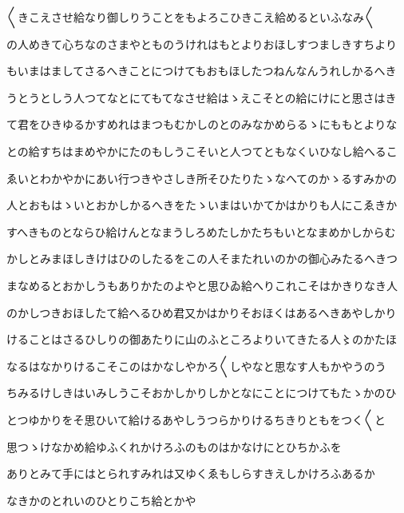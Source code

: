 \documentclass[a4paper,11pt,landscape]{ltjtarticle}
\begin{document}
〱きこえさせ給なり御しりうことをもよろこひきこえ給めるといふなみ〱
\par\medskip
の人めきて心ちなのさまやとものうけれはもとよりおほしすつましきすちより
\par\medskip
もいまはましてさるへきことにつけてもおもほしたつねんなんうれしかるへき
\par\medskip
うとうとしう人つてなとにてもてなさせ給はゝえこそとの給にけにと思さはき
\par\medskip
て君をひきゆるかすめれはまつもむかしのとのみなかめらるゝにももとよりな
\par\medskip
との給すちはまめやかにたのもしうこそいと人つてともなくいひなし給へるこ
\par\medskip
ゑいとわかやかにあい行つきやさしき所そひたりたゝなへてのかゝるすみかの
\par\medskip
人とおもはゝいとおかしかるへきをたゝいまはいかてかはかりも人にこゑきか
\par\medskip
すへきものとならひ給けんとなまうしろめたしかたちもいとなまめかしからむ
\par\medskip
かしとみまほしきけはひのしたるをこの人そまたれいのかの御心みたるへきつ
\par\medskip
まなめるとおかしうもありかたのよやと思ひゐ給へりこれこそはかきりなき人
\par\medskip
のかしつきおほしたて給へるひめ君又かはかりそおほくはあるへきあやしかり
\par\medskip
けることはさるひしりの御あたりに山のふところよりいてきたる人〻のかたほ
\par\medskip
なるはなかりけるこそこのはかなしやかろ〱しやなと思なす人もかやうのう
\par\medskip
ちみるけしきはいみしうこそおかしかりしかとなにことにつけてもたゝかのひ
\par\medskip
とつゆかりをそ思ひいて給けるあやしうつらかりけるちきりともをつく〱と
\par\medskip
思つゝけなかめ給ゆふくれかけろふのものはかなけにとひちかふを
\par\medskip
ありとみて手にはとられすみれは又ゆくゑもしらすきえしかけろふあるか
\par\medskip
なきかのとれいのひとりこち給とかや
\par\medskip
\end{document}
